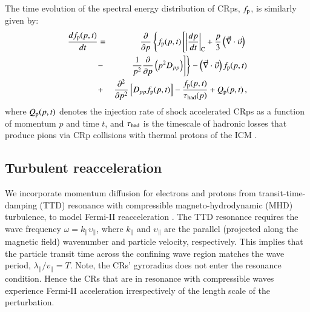 \documentclass[useAMS,usenatbib]{mn2e}
\begin{document}
The time evolution of the spectral energy distribution of CRps,
$f_{{\mathrm{p}}}$, is similarly given by:
\begin{eqnarray}
{{d f_{{\mathrm{p}}}(p,t)}\over{d t}} &=&
{{\partial }\over{\partial p}}
\left\{
f_{{\mathrm{p}}}(p,t)\left[ \left|{{dp}\over{dt}}\right|_{\rm C}
+ \frac{p}{3}\left(\vec{\nabla}\cdot \vec{\upsilon}\right)\right.\right.
\nonumber\\
&-&\left.\left. {1\over{p^2}}{{\partial }\over{\partial p}}\left(p^2 D_{pp}\right)
\right]\right\} - \left(\vec{\nabla}\cdot \vec{\upsilon}\right) f_{{\mathrm{p}}}(p,t)
\nonumber\\
&+& {{\partial^2 }\over{\partial p^2}}
\left[ D_{pp} f_{{\mathrm{p}}}(p,t) \right] - {{f_{{\mathrm{p}}}(p,t)}\over{\tau_{\rm had}(p)}}
+ Q_{{\mathrm{p}}}(p,t)\, ,
\label{eq:FP_p}
\end{eqnarray}
where $Q_{{\mathrm{p}}}(p,t)$ denotes the injection rate of shock
accelerated CRps as a function of momentum $p$ and time $t$, and
$\tau_{\rm had}$ is the timescale of hadronic losses that produce
pions via CRp collisions with thermal protons of the ICM
\cite[e.g.][]{brunetti11}.  

\subsection{Turbulent reacceleration}

We incorporate momentum diffusion for electrons and protons from
transit-time-damping (TTD) resonance with compressible
magneto-hydrodynamic (MHD) turbulence, to model Fermi-II
reacceleration \citep{brunetti07,brunetti11}. The TTD resonance
requires the wave frequency $\omega=k_\parallel\upsilon_\parallel$,
where $k_\parallel$ and $\upsilon_\parallel$ are the parallel
(projected along the magnetic field) wavenumber and particle velocity,
respectively. This implies that the particle transit time across the
confining wave region matches the wave period,
$\lambda_{\parallel}/v_{\parallel}=T$. Note, the CRs' gyroradius does
not enter the resonance condition. Hence the CRs that are in resonance
with compressible waves experience Fermi-II acceleration
irrespectively of the length scale of the perturbation.
\end{document}
